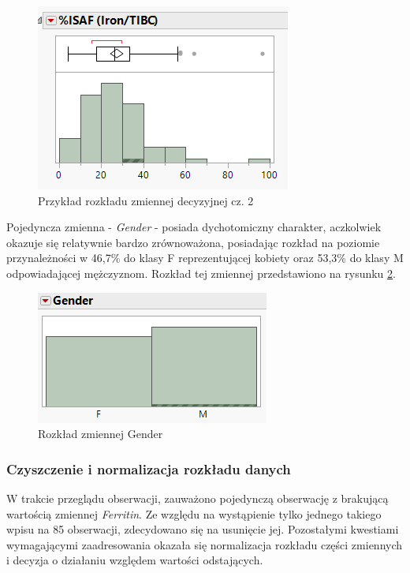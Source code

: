 	\newpage
	\begin{figure}[!ht]
		\centering
		\includegraphics[width=0.6\linewidth]{Rozdzial3/decision1}
		\caption{Przykład rozkładu zmiennej decyzyjnej cz. 2}
		\label{fig:decision1}
	\end{figure}

	Pojedyncza zmienna - \textit{Gender} - posiada dychotomiczny charakter, aczkolwiek okazuje się relatywnie bardzo zrównoważona, posiadając rozkład na poziomie przynależności w 46,7\% do klasy F reprezentującej kobiety oraz 53,3\% do klasy M odpowiadającej mężczyznom. Rozkład tej zmiennej przedstawiono na rysunku \ref{fig:mnf}.
	
	\begin{figure}[!ht]
		\centering
		\includegraphics[width=0.6\linewidth]{Rozdzial3/mnf}
		\caption{Rozkład zmiennej Gender}
		\label{fig:mnf}
	\end{figure}
	
	\subsubsection{Czyszczenie i normalizacja rozkładu danych}
	
	W trakcie przeglądu obserwacji, zauważono pojedynczą obserwację z brakującą wartością zmiennej \textit{Ferritin}. Ze względu na wystąpienie tylko jednego takiego wpisu na 85 obserwacji, zdecydowano się na usunięcie jej. Pozostałymi kwestiami wymagającymi zaadresowania okazała się normalizacja rozkładu części zmiennych i decyzja o działaniu względem wartości odstających.
	

